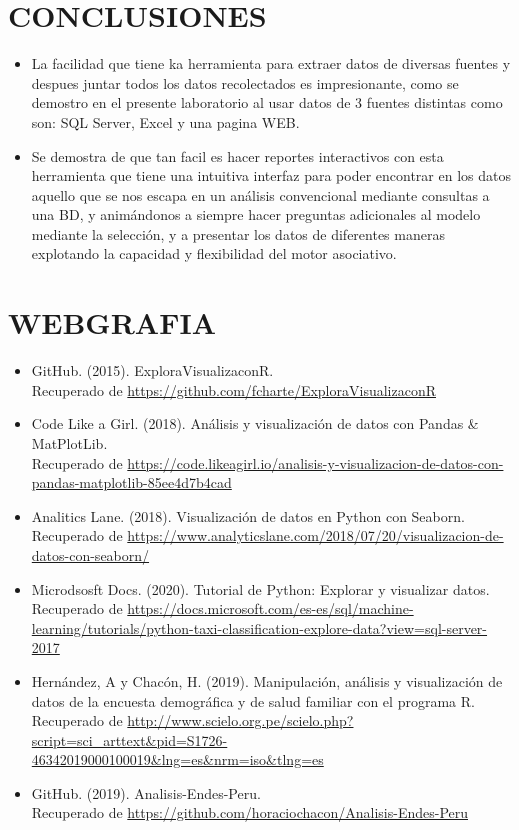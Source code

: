 \documentclass[12pt,letterpaper]{article}
\begin{document}
    \newpage
    \section{CONCLUSIONES}
    \begin{itemize}
        \item La facilidad que tiene ka herramienta para extraer datos de diversas fuentes y despues juntar todos los datos recolectados es impresionante, como se demostro en el presente laboratorio al usar datos de 3 fuentes distintas como son: SQL Server, Excel y una pagina WEB.
        \item Se demostra de que tan facil es hacer reportes interactivos con esta herramienta que tiene una intuitiva interfaz para poder encontrar en los datos aquello que se nos escapa en un análisis convencional mediante consultas a una BD, y animándonos a siempre hacer preguntas adicionales al modelo mediante la selección, y a presentar los datos de diferentes maneras explotando la capacidad y flexibilidad del motor asociativo.
    \end{itemize}
    
    \newpage
    \section{WEBGRAFIA}
    \begin{itemize}
        \item GitHub. (2015). ExploraVisualizaconR.\\
        Recuperado de \textcolor{azul}{\url{https://github.com/fcharte/ExploraVisualizaconR}}
        \item Code Like a Girl. (2018). Análisis y visualización de datos con Pandas \& MatPlotLib.\\
        Recuperado de \textcolor{azul}{\url{https://code.likeagirl.io/analisis-y-visualizacion-de-datos-con-pandas-matplotlib-85ee4d7b4cad}}
        \item Analitics Lane. (2018). Visualización de datos en Python con Seaborn.\\
        Recuperado de \textcolor{azul}{\url{https://www.analyticslane.com/2018/07/20/visualizacion-de-datos-con-seaborn/}}
        \item Microdsosft Docs. (2020). Tutorial de Python: Explorar y visualizar datos.\\
        Recuperado de \textcolor{azul}{\url{https://docs.microsoft.com/es-es/sql/machine-learning/tutorials/python-taxi-classification-explore-data?view=sql-server-2017}}
        \item Hernández, A y Chacón, H. (2019). Manipulación, análisis y visualización de datos de la encuesta demográfica y de salud familiar con el programa R.\\
        Recuperado de \textcolor{azul}{\url{http://www.scielo.org.pe/scielo.php?script=sci_arttext&pid=S1726-46342019000100019&lng=es&nrm=iso&tlng=es}}
        \item GitHub. (2019). Analisis-Endes-Peru.\\
        Recuperado de \textcolor{azul}{\url{https://github.com/horaciochacon/Analisis-Endes-Peru}}
    \end{itemize}
\end{document}

